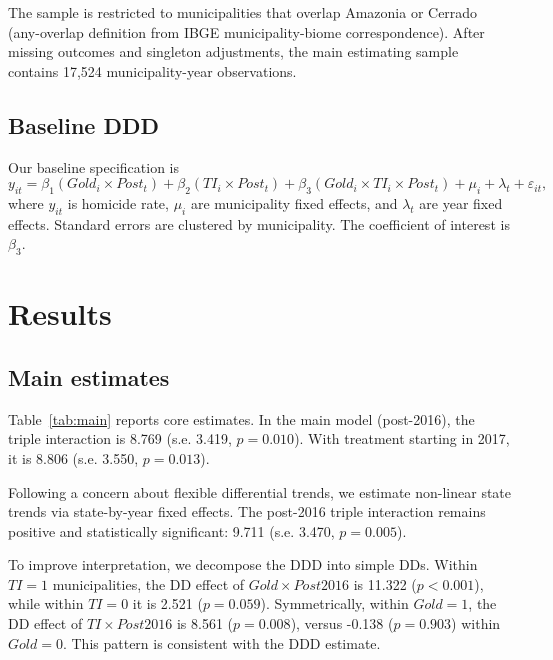 \documentclass[preprint,12pt]{elsarticle}
\begin{document}
The sample is restricted to municipalities that overlap Amazonia or Cerrado (any-overlap definition from IBGE municipality-biome correspondence). After missing outcomes and singleton adjustments, the main estimating sample contains 17,524 municipality-year observations.

\subsection{Baseline DDD}
Our baseline specification is
\begin{equation}
y_{it} = \beta_1(Gold_i \times Post_t) + \beta_2(TI_i \times Post_t) + \beta_3(Gold_i \times TI_i \times Post_t) + \mu_i + \lambda_t + \varepsilon_{it},
\end{equation}
where \(y_{it}\) is homicide rate, \(\mu_i\) are municipality fixed effects, and \(\lambda_t\) are year fixed effects. Standard errors are clustered by municipality. The coefficient of interest is \(\beta_3\).

\section{Results}
\subsection{Main estimates}
Table~\ref{tab:main} reports core estimates. In the main model (post-2016), the triple interaction is 8.769 (s.e. 3.419, \(p=0.010\)). With treatment starting in 2017, it is 8.806 (s.e. 3.550, \(p=0.013\)).

Following a concern about flexible differential trends, we estimate non-linear state trends via state-by-year fixed effects. The post-2016 triple interaction remains positive and statistically significant: 9.711 (s.e. 3.470, \(p=0.005\)).

\begin{table}[H]
\caption{Main DDD estimates in Amazonia+Cerrado municipalities (2010--2022)}
\label{tab:main}
\centering
\footnotesize
\setlength{\tabcolsep}{3.5pt}
\renewcommand{\arraystretch}{0.95}
\resizebox{\textwidth}{!}{}
\end{table}

To improve interpretation, we decompose the DDD into simple DDs. Within \(TI=1\) municipalities, the DD effect of \(Gold\times Post2016\) is 11.322 (\(p<0.001\)), while within \(TI=0\) it is 2.521 (\(p=0.059\)). Symmetrically, within \(Gold=1\), the DD effect of \(TI\times Post2016\) is 8.561 (\(p=0.008\)), versus -0.138 (\(p=0.903\)) within \(Gold=0\). This pattern is consistent with the DDD estimate.
\end{document}
